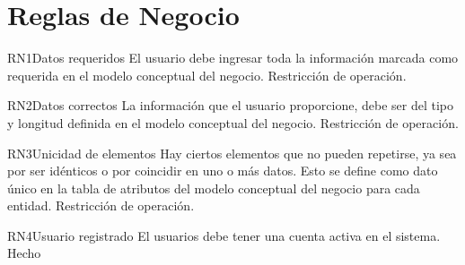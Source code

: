 \section{Reglas de Negocio}

\begin{BussinesRule}{RN1}{Datos requeridos} 
	\BRitem[Descripción:]  El usuario debe ingresar toda la información marcada como requerida en el modelo conceptual del negocio.
	\BRitem[Tipo:] Restricción de operación.	
\end{BussinesRule}

\begin{BussinesRule}{RN2}{Datos correctos} 
	\BRitem[Descripción:] La información que el usuario proporcione, debe ser del tipo y longitud definida en el modelo conceptual del negocio.
	\BRitem[Tipo:] Restricción de operación.	
\end{BussinesRule}

\begin{BussinesRule}{RN3}{Unicidad de elementos} 
	\BRitem[Descripción:] Hay ciertos elementos que no pueden repetirse, ya sea por ser idénticos o por coincidir en uno o más datos. Esto se define como dato único en la tabla de atributos del modelo conceptual del negocio para cada entidad.
	\BRitem[Tipo:] Restricción de operación.	
\end{BussinesRule}

\begin{BussinesRule}{RN4}{Usuario registrado} 
	\BRitem[Descripción:] El usuarios debe tener una cuenta activa en el sistema.
	\BRitem[Tipo:] Hecho
\end{BussinesRule}